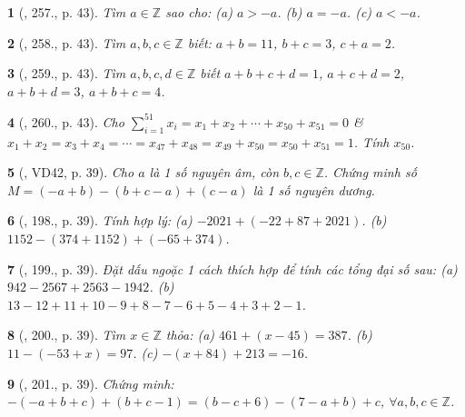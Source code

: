 \documentclass{article}
\newtheorem{baitoan}{}
\begin{document}
\begin{baitoan}[\cite{Binh_Toan_6_tap_1}, 257., p. 43]
	Tìm $a\in\mathbb{Z}$ sao cho: (a) $a > -a$. (b) $a = -a$. (c) $a < -a$.
\end{baitoan}

\begin{baitoan}[\cite{Binh_Toan_6_tap_1}, 258., p. 43]
	Tìm $a,b,c\in\mathbb{Z}$ biết: $a + b = 11$, $b + c = 3$, $c + a = 2$.
\end{baitoan}

\begin{baitoan}[\cite{Binh_Toan_6_tap_1}, 259., p. 43]
	Tìm $a,b,c,d\in\mathbb{Z}$ biết $a + b + c + d = 1$, $a + c + d = 2$, $a + b + d = 3$, $a + b + c = 4$.
\end{baitoan}

\begin{baitoan}[\cite{Binh_Toan_6_tap_1}, 260., p. 43]
	Cho $\sum_{i=1}^{51} x_i = x_1 + x_2 + \cdots + x_{50} + x_{51} = 0$ \& $x_1 + x_2 = x_3 + x_4 = \cdots = x_{47} + x_{48} = x_{49} + x_{50} = x_{50} + x_{51} = 1$. Tính $x_{50}$.
\end{baitoan}

\begin{baitoan}[\cite{Tuyen_Toan_6}, VD42, p. 39]
	Cho $a$ là 1 số nguyên âm, còn $b,c\in\mathbb{Z}$. Chứng minh số $M = (-a + b) - (b + c - a) + (c - a)$ là 1 số nguyên dương.
\end{baitoan}

\begin{baitoan}[\cite{Tuyen_Toan_6}, 198., p. 39]
	Tính hợp lý: (a) $-2021 + (-22 + 87 + 2021)$. (b) $1152 - (374 + 1152) + (-65 + 374)$.
\end{baitoan}

\begin{baitoan}[\cite{Tuyen_Toan_6}, 199., p. 39]
	Đặt dấu ngoặc 1 cách thích hợp để tính các tổng đại số sau: (a) $942 - 2567 + 2563 - 1942$. (b) $13 - 12 + 11 + 10 - 9 + 8 - 7 - 6 + 5 - 4 + 3 + 2 - 1$.
\end{baitoan}

\begin{baitoan}[\cite{Tuyen_Toan_6}, 200., p. 39]
	Tìm $x\in\mathbb{Z}$ thỏa: (a) $461 + (x - 45) = 387$. (b) $11 - (-53 + x) = 97$. (c) $-(x + 84) + 213 = -16$.
\end{baitoan}

\begin{baitoan}[\cite{Tuyen_Toan_6}, 201., p. 39]
	Chứng minh: $-(-a + b + c) + (b + c - 1) = (b - c + 6) - (7 - a + b) + c$, $\forall a,b,c\in\mathbb{Z}$.
\end{baitoan}
\end{document}
